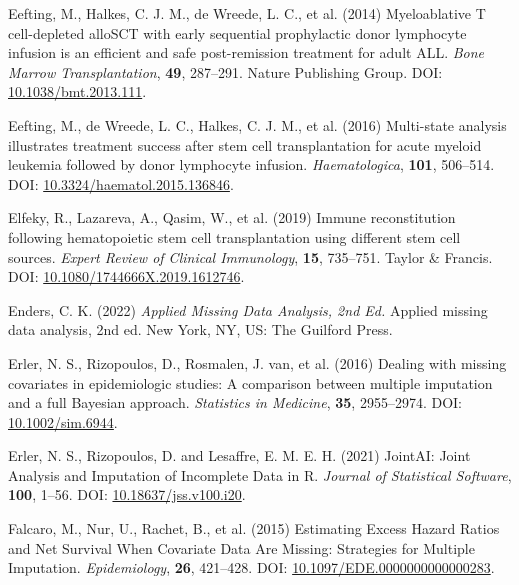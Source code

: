 \documentclass[
  letterpaper,
  paper=240mm:170mm,
  twoside=true,
  open=right,
  fontsize=10pt,
  pagesize=false,
  BCOR=15mm,
  DIV=14,
  headinclude=true,
  footinclude=false,
  headsepline=on]{scrbook}
\newlength{\cslhangindent}
\newenvironment{CSLReferences}[2] %
 {\begin{list}{}{%
  \setlength{\itemindent}{0pt}
  \setlength{\leftmargin}{0pt}
  \setlength{\parsep}{0pt}
  \ifodd #1
   \setlength{\leftmargin}{\cslhangindent}
   \setlength{\itemindent}{-1\cslhangindent}
  \fi
  \setlength{\itemsep}{#2\baselineskip}}}
 {\end{list}}
\begin{document}
\begin{CSLReferences}{1}{1}
Eefting, M., Halkes, C. J. M., de Wreede, L. C., et al. (2014)
Myeloablative {T} cell-depleted {alloSCT} with early sequential
prophylactic donor lymphocyte infusion is an efficient and safe
post-remission treatment for adult {ALL}. \emph{Bone Marrow
Transplantation}, \textbf{49}, 287--291. Nature Publishing Group. DOI:
\href{https://doi.org/10.1038/bmt.2013.111}{10.1038/bmt.2013.111}.

Eefting, M., de Wreede, L. C., Halkes, C. J. M., et al. (2016)
Multi-state analysis illustrates treatment success after stem cell
transplantation for acute myeloid leukemia followed by donor lymphocyte
infusion. \emph{Haematologica}, \textbf{101}, 506--514. DOI:
\href{https://doi.org/10.3324/haematol.2015.136846}{10.3324/haematol.2015.136846}.

Elfeky, R., Lazareva, A., Qasim, W., et al. (2019) Immune reconstitution
following hematopoietic stem cell transplantation using different stem
cell sources. \emph{Expert Review of Clinical Immunology}, \textbf{15},
735--751. Taylor \& Francis. DOI:
\href{https://doi.org/10.1080/1744666X.2019.1612746}{10.1080/1744666X.2019.1612746}.

Enders, C. K. (2022) \emph{Applied Missing Data Analysis, 2nd Ed.}
Applied missing data analysis, 2nd ed. New York, NY, US: The Guilford
Press.

Erler, N. S., Rizopoulos, D., Rosmalen, J. van, et al. (2016) Dealing
with missing covariates in epidemiologic studies: A comparison between
multiple imputation and a full {Bayesian} approach. \emph{Statistics in
Medicine}, \textbf{35}, 2955--2974. DOI:
\href{https://doi.org/10.1002/sim.6944}{10.1002/sim.6944}.

Erler, N. S., Rizopoulos, D. and Lesaffre, E. M. E. H. (2021) {JointAI}:
{Joint Analysis} and {Imputation} of {Incomplete Data} in {R}.
\emph{Journal of Statistical Software}, \textbf{100}, 1--56. DOI:
\href{https://doi.org/10.18637/jss.v100.i20}{10.18637/jss.v100.i20}.

Falcaro, M., Nur, U., Rachet, B., et al. (2015) Estimating {Excess
Hazard Ratios} and {Net Survival When Covariate Data Are Missing}:
{Strategies} for {Multiple Imputation}. \emph{Epidemiology},
\textbf{26}, 421--428. DOI:
\href{https://doi.org/10.1097/EDE.0000000000000283}{10.1097/EDE.0000000000000283}.


\end{CSLReferences}
\end{document}
